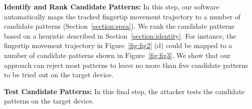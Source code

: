      \vspace{2mm}
    \noindent {} \textbf{Identify and Rank Candidate Patterns:} In this step, our software automatically maps the tracked fingertip movement trajectory to a number of candidate patterns (Section~\ref{section:spea}).
    We rank the candidate patterns based on a heuristic described in Section~\ref{section:identity}.
    For instance, the fingertip movement trajectory in Figure~\ref{fig:fig2} (d) could be mapped to a number of candidate patterns shown in Figure~\ref{fig:fig3}.
    We show that our approach can reject most patterns to leave no more than five candidate patterns to be tried out on the target device.

     \vspace{2mm}
    \noindent {} \textbf{Test Candidate Patterns:} In this final step, the attacker tests the candidate patterns on the target device.



